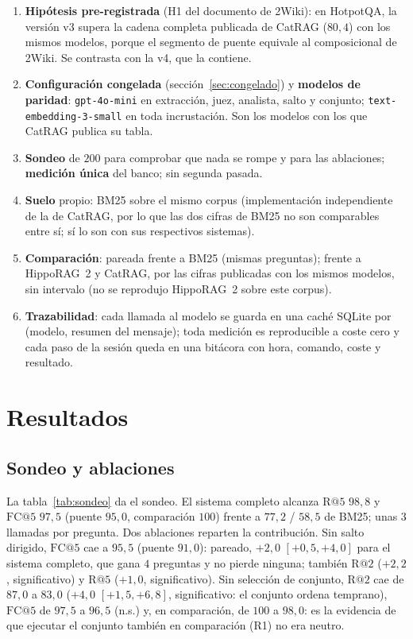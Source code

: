 \documentclass[11pt,a4paper]{article}
\newcommand{\hippo}{HippoRAG~2}
\begin{document}
\begin{enumerate}[leftmargin=1.6em, itemsep=1pt]
\item \textbf{Hipótesis pre-registrada} (H1 del documento de 2Wiki): en
  HotpotQA, la versión v3 supera la cadena completa publicada de CatRAG
  ($80{,}4$) con los mismos modelos, porque el segmento de puente equivale
  al composicional de 2Wiki. Se contrasta con la v4, que la contiene.
\item \textbf{Configuración congelada} (sección~\ref{sec:congelado}) y
  \textbf{modelos de paridad}: \texttt{gpt-4o-mini} en extracción, juez,
  analista, salto y conjunto; \texttt{text-embedding-3-small} en toda
  incrustación. Son los modelos con los que CatRAG publica su tabla.
\item \textbf{Sondeo} de $200$ para comprobar que nada se rompe y para las
  ablaciones; \textbf{medición única} del banco; sin segunda pasada.
\item \textbf{Suelo} propio: BM25 sobre el mismo corpus (implementación
  independiente de la de CatRAG, por lo que las dos cifras de BM25 no son
  comparables entre sí; sí lo son con sus respectivos sistemas).
\item \textbf{Comparación}: pareada frente a BM25 (mismas preguntas); frente
  a \hippo{} y CatRAG, por las cifras publicadas con los mismos modelos, sin
  intervalo (no se reprodujo \hippo{} sobre este corpus).
\item \textbf{Trazabilidad}: cada llamada al modelo se guarda en una caché
  SQLite por (modelo, resumen del mensaje); toda medición es reproducible a
  coste cero y cada paso de la sesión queda en una bitácora con hora,
  comando, coste y resultado.
\end{enumerate}

\section{Resultados}
\label{sec:resultados}

\subsection{Sondeo y ablaciones}
\label{sec:sondeo}

La tabla~\ref{tab:sondeo} da el sondeo. El sistema completo alcanza
$\mathrm{R@}5$ $98{,}8$ y $\mathrm{FC@}5$ $97{,}5$ (puente $95{,}0$,
comparación $100$) frente a $77{,}2$ / $58{,}5$ de BM25; unas $3$ llamadas
por pregunta. Dos ablaciones reparten la contribución. Sin salto dirigido,
$\mathrm{FC@}5$ cae a $95{,}5$ (puente $91{,}0$): pareado, $+2{,}0$
$[+0{,}5,+4{,}0]$ para el sistema completo, que gana $4$ preguntas y no
pierde ninguna; también $\mathrm{R@}2$ ($+2{,}2$, significativo) y
$\mathrm{R@}5$ ($+1{,}0$, significativo). Sin selección de conjunto,
$\mathrm{R@}2$ cae de $87{,}0$ a $83{,}0$ ($+4{,}0$ $[+1{,}5,+6{,}8]$,
significativo: el conjunto ordena temprano), $\mathrm{FC@}5$ de $97{,}5$ a
$96{,}5$ (n.s.) y, en comparación, de $100$ a $98{,}0$: es la evidencia de
que ejecutar el conjunto también en comparación (R1) no era neutro.
\end{document}
